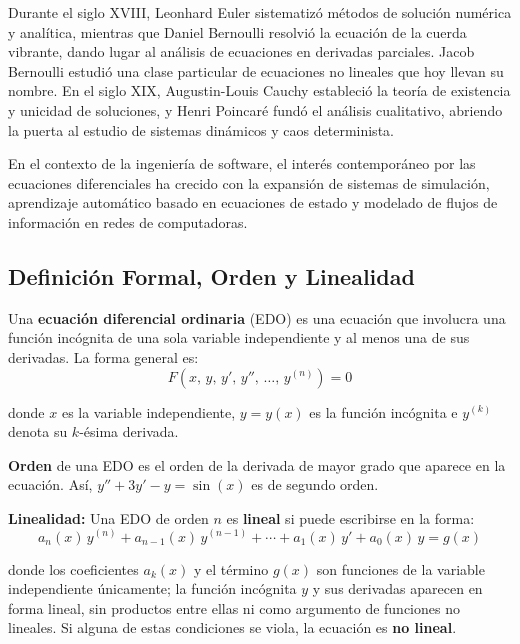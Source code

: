 \documentclass[12pt,letterpaper]{report}
\numberwithin{equation}{chapter}
\numberwithin{figure}{chapter}
\numberwithin{table}{chapter}
\begin{document}
Durante el siglo XVIII, Leonhard Euler sistematizó métodos de solución numérica y analítica, mientras que Daniel Bernoulli resolvió la ecuación de la cuerda vibrante, dando lugar al análisis de ecuaciones en derivadas parciales. Jacob Bernoulli estudió una clase particular de ecuaciones no lineales que hoy llevan su nombre. En el siglo XIX, Augustin-Louis Cauchy estableció la teoría de existencia y unicidad de soluciones, y Henri Poincaré fundó el análisis cualitativo, abriendo la puerta al estudio de sistemas dinámicos y caos determinista.

En el contexto de la ingeniería de software, el interés contemporáneo por las ecuaciones diferenciales ha crecido con la expansión de sistemas de simulación, aprendizaje automático basado en ecuaciones de estado y modelado de flujos de información en redes de computadoras.

\subsection{Definición Formal, Orden y Linealidad}

Una \textbf{ecuación diferencial ordinaria} (EDO) es una ecuación que involucra una función incógnita de una sola variable independiente y al menos una de sus derivadas. La forma general es:
\begin{equation*}
F\!\left(x,\, y,\, y',\, y'',\, \ldots,\, y^{(n)}\right) = 0
\end{equation*}

donde $x$ es la variable independiente, $y = y(x)$ es la función incógnita e $y^{(k)}$ denota su $k$-ésima derivada.

\textbf{Orden} de una EDO es el orden de la derivada de mayor grado que aparece en la ecuación. Así, $y'' + 3y' - y = \sin(x)$ es de segundo orden.

\textbf{Linealidad:} Una EDO de orden $n$ es \textbf{lineal} si puede escribirse en la forma:
\begin{equation*}
a_n(x)\,y^{(n)} + a_{n-1}(x)\,y^{(n-1)} + \cdots + a_1(x)\,y' + a_0(x)\,y = g(x)
\end{equation*}

donde los coeficientes $a_k(x)$ y el término $g(x)$ son funciones de la variable independiente únicamente; la función incógnita $y$ y sus derivadas aparecen en forma lineal, sin productos entre ellas ni como argumento de funciones no lineales. Si alguna de estas condiciones se viola, la ecuación es \textbf{no lineal}.
\end{document}
